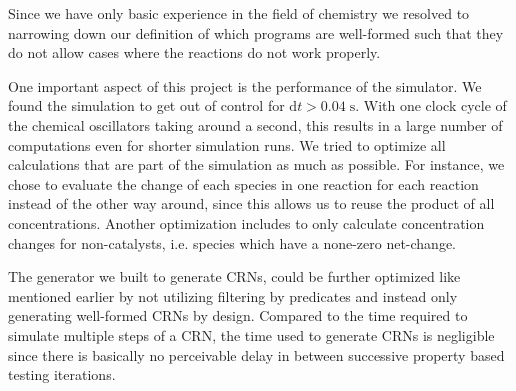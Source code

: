 Since we have only basic experience in the field of chemistry we resolved to narrowing down our definition of which programs are well-formed such that they do not allow cases where the reactions do not work properly.

One important aspect of this project is the performance of the simulator. We found the simulation to get out of control for $\mathrm{d}t > 0.04\;\mathrm{s}$. With one clock cycle of the chemical oscillators taking around a second, this results in a large number of computations even for shorter simulation runs. We tried to optimize all calculations that are part of the simulation as much as possible. For instance, we chose to evaluate the change of each species in one reaction for each reaction instead of the other way around, since this allows us to reuse the product of all concentrations. Another optimization includes to only calculate concentration changes for non-catalysts, i.e. species which have a none-zero net-change.

The generator we built to generate CRNs, could be further optimized like mentioned earlier by not utilizing filtering by predicates and instead only generating well-formed CRNs by design. Compared to the time required to simulate multiple steps of a CRN, the time used to generate CRNs is negligible since there is basically no perceivable delay in between successive property based testing iterations. 

